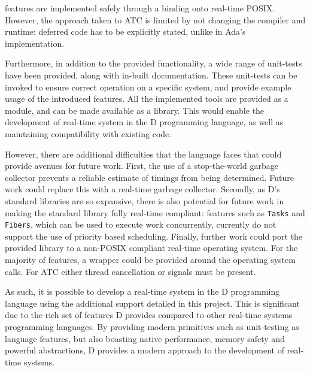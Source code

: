 features are implemented safely through a binding onto real-time POSIX.
However, the approach taken to ATC is limited by not changing the compiler and
runtime: deferred code has to be explicitly stated, unlike in Ada's implementation. 
\par\bigskip\noindent
Furthermore, in addition to the provided functionality, a wide range of unit-tests 
have been provided, along with in-built documentation. 
These unit-tests can be invoked to ensure correct operation on a specific
system, and provide example usage of the introduced features. 
All the implemented tools are provided as a module, and can be made available as 
a library. This would enable the development of real-time system in the D programming 
language, as well as maintaining compatibility with existing code. 
\par\bigskip\noindent
However, there are additional difficulties that the 
language faces that could provide avenues for future work. 
First, the use of a stop-the-world garbage collector prevents a reliable 
estimate of timings from being determined. Future work could replace this with a
real-time garbage collector. 
Secondly, as D's standard libraries are so expansive, there is also potential for future
work in making the standard library fully real-time compliant: features such as
\texttt{Tasks} and \texttt{Fibers}, which can be used to execute work
concurrently, currently do not support the use of priority based scheduling.
Finally, further work could port the provided library to a non-POSIX compliant
real-time operating system. For the majority of features, a wrapper could
be provided around the operating system calls. For ATC either thread cancellation 
or signals must be present. 
\par\bigskip\noindent
As such, it is possible to develop a real-time system in the D programming 
language using the additional support detailed in this project. This is
significant due to the rich set of features D provides compared to other
real-time systems programming languages. By providing modern primitives such as
unit-testing as language features, but also boasting native performance, 
memory safety and powerful abstractions, D provides a modern approach to the
development of real-time systems. 
